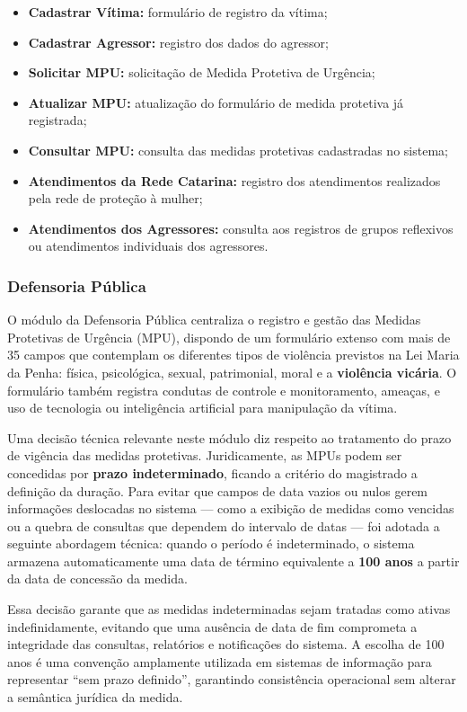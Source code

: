 \begin{itemize}
    \item \textbf{Cadastrar Vítima:} formulário de registro da vítima;
    \item \textbf{Cadastrar Agressor:} registro dos dados do agressor;
    \item \textbf{Solicitar MPU:} solicitação de Medida Protetiva de Urgência;
    \item \textbf{Atualizar MPU:} atualização do formulário de medida protetiva já registrada;
    \item \textbf{Consultar MPU:} consulta das medidas protetivas cadastradas no sistema;
    \item \textbf{Atendimentos da Rede Catarina:} registro dos atendimentos realizados pela rede de proteção à mulher;
    \item \textbf{Atendimentos dos Agressores:} consulta aos registros de grupos reflexivos ou atendimentos individuais dos agressores.
\end{itemize}

\subsubsection{Defensoria Pública}
\par O módulo da Defensoria Pública centraliza o registro e gestão das Medidas Protetivas de Urgência (MPU), dispondo de um formulário extenso com mais de 35 campos que contemplam os diferentes tipos de violência previstos na Lei Maria da Penha: física, psicológica, sexual, patrimonial, moral e a \textbf{violência vicária}. O formulário também registra condutas de controle e monitoramento, ameaças, e uso de tecnologia ou inteligência artificial para manipulação da vítima.

\par Uma decisão técnica relevante neste módulo diz respeito ao tratamento do prazo de vigência das medidas protetivas. Juridicamente, as MPUs podem ser concedidas por \textbf{prazo indeterminado}, ficando a critério do magistrado a definição da duração. Para evitar que campos de data vazios ou nulos gerem informações deslocadas no sistema — como a exibição de medidas como vencidas ou a quebra de consultas que dependem do intervalo de datas — foi adotada a seguinte abordagem técnica: quando o período é indeterminado, o sistema armazena automaticamente uma data de término equivalente a \textbf{100 anos} a partir da data de concessão da medida.

\par Essa decisão garante que as medidas indeterminadas sejam tratadas como ativas indefinidamente, evitando que uma ausência de data de fim comprometa a integridade das consultas, relatórios e notificações do sistema. A escolha de 100 anos é uma convenção amplamente utilizada em sistemas de informação para representar ``sem prazo definido'', garantindo consistência operacional sem alterar a semântica jurídica da medida.

